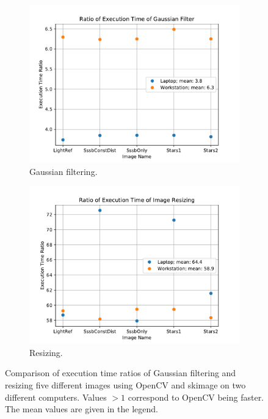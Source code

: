 
\begin{figure}[htb]
    \centering
    \begin{subfigure}[b]{0.47\textwidth}
        \centering
        \includegraphics[width=\textwidth]{doc/thesis/0_figures/cv_skimage/Comparison_Gaussian}
        \caption{Gaussian filtering.}
        \label{fig:bm_comparison_gauss}
    \end{subfigure}
    \begin{subfigure}[b]{0.47\textwidth}
        \centering
        \includegraphics[width=\textwidth]{doc/thesis/0_figures/cv_skimage/Comparison_Resize}
        \caption{Resizing.}
        \label{fig:bm_comparison_res}
    \end{subfigure}
    \caption{Comparison of execution time ratios of Gaussian filtering and resizing five different images using OpenCV and \gls{skimage} on two different computers. Values $> 1$ correspond to OpenCV being faster. The mean values are given in the legend.}
    \label{fig:bm_comparison}
\end{figure}


